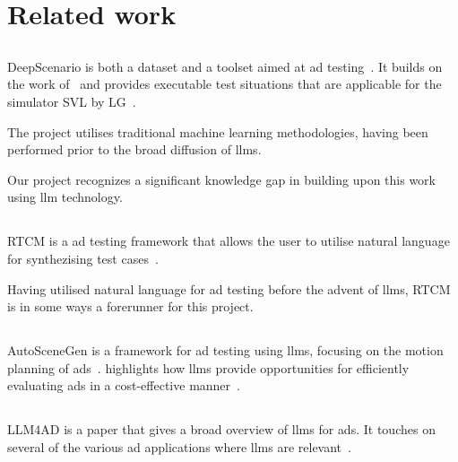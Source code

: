 \section{Related work}\label{sec:relatedWork}

\subsection{}\label{sec:deepScenario}

DeepScenario is both a dataset and a toolset aimed at \acrlong{ad} testing~\cite{DeepScenario}. It
builds on the work of~\cite{CriticalScenarios} and provides executable test situations that are
applicable for the simulator SVL by LG~\cite{lgsvl}.

The project utilises traditional machine learning methodologies, having been performed prior to the
broad diffusion of \acrshort{llms}.

Our project recognizes a significant knowledge gap in building upon this work using \acrshort{llm} technology.

\subsection{}
RTCM is a \acrshort{ad} testing framework that allows the user to utilise natural language for
synthezising test cases~\cite{RTCM}.

Having utilised natural language for \acrshort{ad} testing before the advent of \acrshort{llms},
RTCM is in some ways a forerunner for this project.

\subsection{}

AutoSceneGen is a framework for \acrshort{ad} testing using \acrshort{llms},
focusing on the motion planning of \acrlong{ads}~\cite[14539]{autoSceneGen}.
\citeauthor{autoSceneGen} highlights how \acrshort{llms} provide opportunities
for efficiently evaluating \acrshort{ads} in a cost-effective manner~\cite[14539-14540]{autoSceneGen}.

\subsection{}

LLM4AD is a paper that gives a broad overview of \acrshort{llms} for \acrlong{ads}. It touches on
several of the various \acrshort{ad} applications where \acrshort{llms} are relevant~\cite{LLM4AD}.

